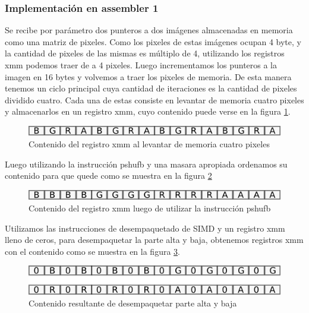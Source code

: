 \documentclass[a4paper]{article}
\begin{document}
\subsubsection{Implementación en assembler 1}

Se recibe por parámetro dos punteros a dos imágenes almacenadas en memoria como una matriz de pixeles. Como los pixeles de estas imágenes ocupan 4 byte, y la cantidad de pixeles de las mismas es múltiplo de 4,  utilizando los registros xmm podemos traer de a 4 pixeles. Luego incrementamos los punteros a la imagen en 16 bytes y volvemos a traer los pixeles de memoria. De esta manera tenemos un ciclo principal cuya cantidad de iteraciones es la cantidad de pixeles dividido cuatro. Cada una de estas consiste en levantar de memoria cuatro pixeles y almacenarlos en un registro xmm, cuyo contenido puede verse en la figura \ref{primerXmm}.

\begin{figure}[H]
\centering
\includegraphics[scale=0.8]{imagenes/primerXmm.png}
\caption{Contenido del registro xmm al levantar de memoria cuatro pixeles}
\label{primerXmm}
\end{figure}

Luego utilizando la instrucción pshufb y una masara apropiada ordenamos su contenido para que quede como se muestra en la figura \ref{segundoXmm}

\begin{figure}[H]
\centering
\includegraphics[scale=0.8]{imagenes/segundoXmm.png}
\caption{Contenido del registro xmm luego de utilizar la instrucción pshufb}
\label{segundoXmm}
\end{figure}

Utilizamos las instrucciones de desempaquetado de SIMD y un registro xmm lleno de ceros, para desempaquetar la parte alta y baja, obtenemos registros xmm con el contenido como se muestra en la figura \ref{tercerXmm}.


\begin{figure}[H]
\centering
\includegraphics[scale=0.8]{imagenes/tecerXmm.png}
\caption{Contenido resultante de desempaquetar parte alta y baja}
\label{tercerXmm}
\end{figure}
\end{document}
